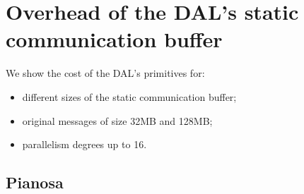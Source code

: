 \section{Overhead of the DAL's static communication buffer}
\label{appendixB}
We show the cost of the DAL's primitives for:
\begin{itemize}
\item different sizes of the static communication buffer;
\item original messages of size 32MB and 128MB;
\item parallelism degrees up to 16.
\end{itemize} 

\subsection*{Pianosa}

